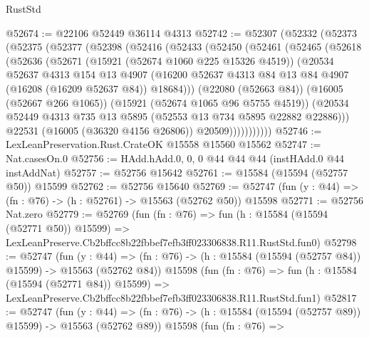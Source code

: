 \begin{lexlean}{RustStd}
\begin{coremodule}
@52674 := @22106 @52449 @36114 @4313
@52742 := @52307
    (@52332
      (@52373
        (@52375
          (@52377
            (@52398
              (@52416
                (@52433
                  (@52450
                    (@52461
                      (@52465
                        (@52618
                          (@52636
                            (@52671
                              (@15921 (@52674 @1060 @225 @15326 @4519))
                              (@20534
                                @52637
                                @4313
                                @154
                                @13
                                @4907
                                (@16200
                                  @52637
                                  @4313
                                  @84
                                  @13
                                  @84
                                  @4907
                                  (@16208 (@16209 @52637 @84))
                                  @18684)))
                            (@22080 (@52663 @84))
                            (@16005 (@52667 @266 @1065))
                            (@15921 (@52674 @1065 @96 @5755 @4519))
                            (@20534
                              @52449
                              @4313
                              @735
                              @13
                              @5895
                              (@52553 @13 @734 @5895 @22882 @22886)))
                          @22531
                          (@16005 (@36320 @4156 @26806))
                          @20509)))))))))))
@52746 := LexLeanPreservation.Rust.CrateOK @15558 @15560 @15562
@52747 := Nat.casesOn.{0}
@52756 := HAdd.hAdd.{0, 0, 0} @44 @44 @44 (instHAdd.{0} @44 instAddNat)
@52757 := @52756 @15642
@52761 := @15584 (@15594 (@52757 @50)) @15599
@52762 := @52756 @15640
@52769 := @52747 (fun (y : @44) => (fn : @76) -> (h : @52761) -> @15563 (@52762 @50)) @15598
@52771 := @52756 Nat.zero
@52779 := @52769
    (fun (fn : @76) =>
    fun (h : @15584 (@15594 (@52771 @50)) @15599) =>
    LexLeanPreserve.Cb2bffcc8b22fbbef7efb3ff023306838.R11.RustStd.fun0)
@52798 := @52747
    (fun (y : @44) =>
    (fn : @76) -> (h : @15584 (@15594 (@52757 @84)) @15599) -> @15563 (@52762 @84))
    @15598
    (fun (fn : @76) =>
    fun (h : @15584 (@15594 (@52771 @84)) @15599) =>
    LexLeanPreserve.Cb2bffcc8b22fbbef7efb3ff023306838.R11.RustStd.fun1)
@52817 := @52747
    (fun (y : @44) =>
    (fn : @76) -> (h : @15584 (@15594 (@52757 @89)) @15599) -> @15563 (@52762 @89))
    @15598
    (fun (fn : @76) =>

\end{coremodule}
\end{lexlean}
